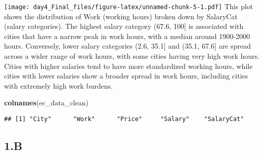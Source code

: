 \documentclass[
]{article}
\newenvironment{Shaded}{\begin{snugshade}}{\end{snugshade}}
\newcommand{\FunctionTok}[1]{\textcolor[rgb]{0.13,0.29,0.53}{\textbf{#1}}}
\newcommand{\NormalTok}[1]{#1}
\begin{document}
\texttt{[image: day4\_Final\_files/figure-latex/unnamed-chunk-5-1.pdf]}
This plot shows the distribution of Work (working hours) broken down by
SalaryCat (salary categories). The highest salary category (67.6, 100{]}
is associated with cities that have a narrow peak in work hours, with a
median around 1900-2000 hours. Conversely, lower salary categories (2.6,
35.1{]} and (35.1, 67.6{]} are spread across a wider range of work
hours, with some cities having very high work hours. Cities with higher
salaries tend to have more standardized working hours, while cities with
lower salaries show a broader spread in work hours, including cities
with extremely high work burdens.

\begin{Shaded}
\begin{Highlighting}[]
\FunctionTok{colnames}\NormalTok{(ec\_data\_clean)}
\end{Highlighting}
\end{Shaded}

\begin{verbatim}
## [1] "City"      "Work"      "Price"     "Salary"    "SalaryCat"
\end{verbatim}

\subsection{1.B}\label{b}
\end{document}
